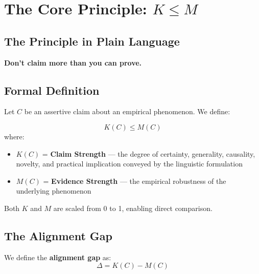\documentclass[11pt,a4paper]{article}
\begin{document}

\section{The Core Principle: $K \leq M$}

\subsection{The Principle in Plain Language}

\begin{principlebox}
\textbf{Don't claim more than you can prove.}
\end{principlebox}


\subsection{Formal Definition}

Let $C$ be an assertive claim about an empirical phenomenon. We define:

\begin{principlebox}
\begin{equation}
K(C) \leq M(C)
\end{equation}
where:
\begin{itemize}
    \item $K(C)$ = \textbf{Claim Strength} --- the degree of certainty, generality, causality, novelty, and practical implication conveyed by the linguistic formulation
    \item $M(C)$ = \textbf{Evidence Strength} --- the empirical robustness of the underlying phenomenon
\end{itemize}
Both $K$ and $M$ are scaled from 0 to 1, enabling direct comparison.
\end{principlebox}


\subsection{The Alignment Gap}

We define the \textbf{alignment gap} as:
\begin{equation}
\Delta = K(C) - M(C)
\end{equation}
\end{document}
